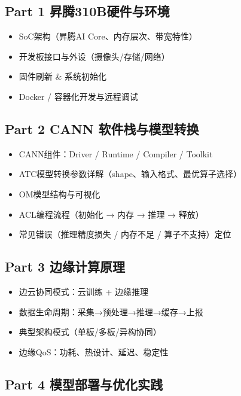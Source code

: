 \subsection{Part 1
昇腾310B硬件与环境}\label{part-1-ux6607ux817e310bux786cux4ef6ux4e0eux73afux5883}

\begin{itemize}
\tightlist
\item
  SoC架构（昇腾AI Core、内存层次、带宽特性）
\item
  开发板接口与外设（摄像头/存储/网络）
\item
  固件刷新 \& 系统初始化
\item
  Docker / 容器化开发与远程调试
\end{itemize}

\subsection{Part 2 CANN
软件栈与模型转换}\label{part-2-cann-ux8f6fux4ef6ux6808ux4e0eux6a21ux578bux8f6cux6362}

\begin{itemize}
\tightlist
\item
  CANN组件：Driver / Runtime / Compiler / Toolkit
\item
  ATC模型转换参数详解（shape、输入格式、最优算子选择）
\item
  OM模型结构与可视化
\item
  ACL编程流程（初始化 → 内存 → 推理 → 释放）
\item
  常见错误（推理精度损失 / 内存不足 / 算子不支持）定位
\end{itemize}

\subsection{Part 3
边缘计算原理}\label{part-3-ux8fb9ux7f18ux8ba1ux7b97ux539fux7406}

\begin{itemize}
\tightlist
\item
  边云协同模式：云训练 + 边缘推理
\item
  数据生命周期：采集→预处理→推理→缓存→上报
\item
  典型架构模式（单板/多板/异构协同）
\item
  边缘QoS：功耗、热设计、延迟、稳定性
\end{itemize}

\subsection{Part 4
模型部署与优化实践}\label{part-4-ux6a21ux578bux90e8ux7f72ux4e0eux4f18ux5316ux5b9eux8df5}

